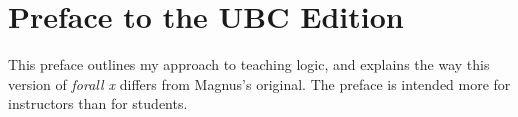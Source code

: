 

\iffalse

\chapter*{Preface to the UBC Edition}
\label{ch.preface}

This preface outlines my approach to teaching logic, and explains the way this version of \emph{forall x} differs from Magnus's original. The preface is intended more for instructors than for students. 

